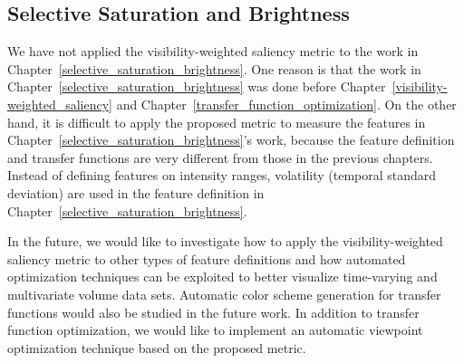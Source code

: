 \subsection{Selective Saturation and Brightness}
We have not applied the visibility-weighted saliency metric to the work in Chapter~\ref{selective_saturation_brightness}. One reason is that the work in Chapter~\ref{selective_saturation_brightness} was done before Chapter~\ref{visibility-weighted_saliency} and Chapter~\ref{transfer_function_optimization}. On the other hand, it is difficult to apply the proposed metric to measure the features in Chapter~\ref{selective_saturation_brightness}'s work, because the feature definition and transfer functions are very different from those in the previous chapters. Instead of defining features on intensity ranges, volatility (temporal standard deviation) are used in the feature definition in Chapter~\ref{selective_saturation_brightness}.

In the future, we would like to investigate how to apply the visibility-weighted saliency metric to other types of feature definitions and how automated optimization techniques can be exploited to better visualize time-varying and multivariate volume data sets. Automatic color scheme generation \cite{zhou_automatic_2009} for transfer functions would also be studied in the future work.
In addition to transfer function optimization, we would like to implement an automatic viewpoint optimization technique based on the proposed metric.

